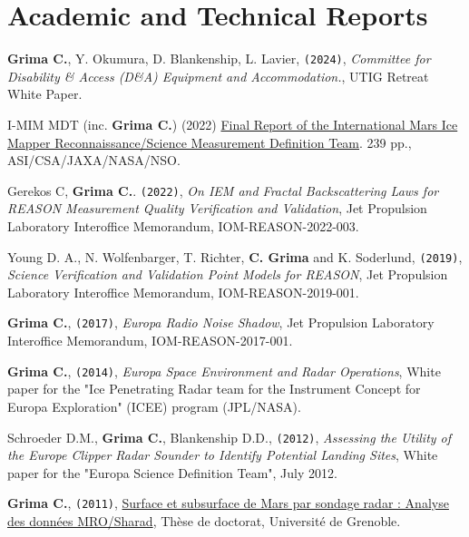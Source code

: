 \section*{Academic and Technical Reports}

\begin{etaremune}
\def\labelenumi{\arabic{enumi}.}

\item
   \textbf{Grima C.}, Y. Okumura, D. Blankenship, L. Lavier, \texttt{(2024)}, \emph{Committee for Disability \& Access (D\&A) Equipment and Accommodation.}, UTIG Retreat White Paper.
   
\item 
   I-MIM MDT (inc. \textbf{Grima C.}) (2022) \href{https://smd-cms.nasa.gov/wp-content/uploads/2023/10/i-mim-mdt-final-report-31-aug-2022-final-hi-qual-copy-tagged.pdf}{Final Report of the International Mars Ice Mapper Reconnaissance/Science Measurement Definition Team}. 239 pp., ASI/CSA/JAXA/NASA/NSO.
   
\item
   Gerekos C, \textbf{Grima C.}. \texttt{(2022)}, \emph{On IEM and Fractal Backscattering Laws for REASON Measurement Quality Verification and Validation}, Jet Propulsion Laboratory Interoffice Memorandum, IOM-REASON-2022-003.
   
\item
   Young D. A., N. Wolfenbarger, T. Richter, \textbf{C. Grima} and K. Soderlund, \texttt{(2019)}, \emph{Science Verification and Validation Point Models for REASON}, Jet Propulsion Laboratory Interoffice Memorandum, IOM-REASON-2019-001.
   
\item
  \textbf{Grima C.}, \texttt{(2017)}, \emph{Europa Radio Noise Shadow},
  Jet Propulsion Laboratory Interoffice Memorandum, IOM-REASON-2017-001.
  
\item
  \textbf{Grima C.}, \texttt{(2014)}, \emph{Europa Space Environment and
  Radar Operations}, White paper for the "Ice Penetrating Radar team for
  the Instrument Concept for Europa Exploration" (ICEE) program
  (JPL/NASA).
  
\item
  Schroeder D.M., \textbf{Grima C.}, Blankenship D.D., \texttt{(2012)},
  \emph{Assessing the Utility of the Europe Clipper Radar Sounder to
  Identify Potential Landing Sites}, White paper for the "Europa Science
  Definition Team", July 2012.
  
\item
  \textbf{Grima C.}, \texttt{(2011)},
  \href{https://www.google.com/url?sa=t\&rct=j\&q=\&esrc=s\&source=web\&cd=2\&ved=0ahUKEwiu-Jn8t7LPAhWEOSYKHQOlBeUQFggrMAE\&url=http\%3A\%2F\%2Fwww.theses.fr\%2F2011GRENU004.pdf\&usg=AFQjCNFcVxpOJiku0pWYrUsHbDrZU01hiA\&sig2=RAzQ2GJJIpOr1U3PEjRsXw}{Surface
  et subsurface de Mars par sondage radar : Analyse des données
  MRO/Sharad}, Thèse de doctorat, Université de Grenoble.
  

\end{etaremune}
